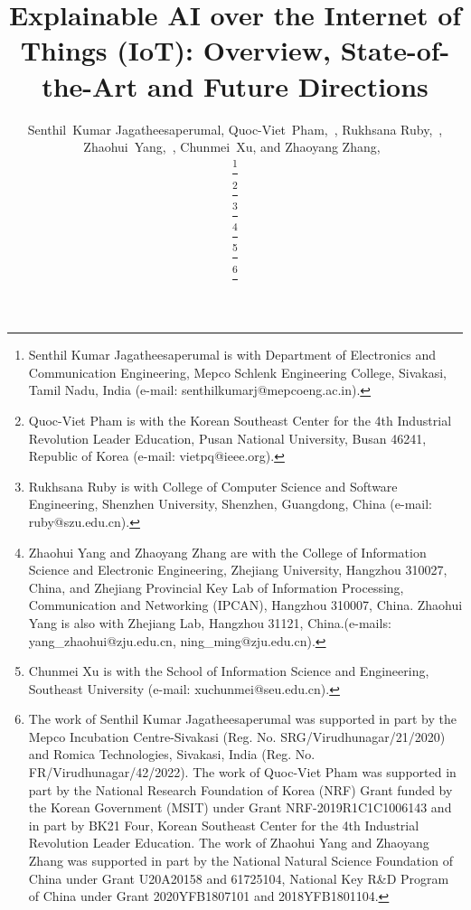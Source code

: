 \documentclass[journal]{IEEEtran}
\begin{document}
\title{Explainable AI over the Internet of Things (IoT): Overview, State-of-the-Art and Future Directions}
\author{Senthil~Kumar Jagatheesaperumal,
        Quoc-Viet~Pham,~,
        Rukhsana Ruby,~,
        Zhaohui~Yang,~, 
        Chunmei~Xu, and
        Zhaoyang Zhang,~

        
\thanks{Senthil Kumar Jagatheesaperumal is with Department of Electronics and Communication Engineering, Mepco Schlenk Engineering College, Sivakasi, Tamil Nadu, India (e-mail: senthilkumarj@mepcoeng.ac.in).}

\thanks{Quoc-Viet Pham is with the Korean Southeast Center for the 4th Industrial Revolution Leader Education, Pusan National University, Busan 46241, Republic of Korea (e-mail: vietpq@ieee.org). }

\thanks{Rukhsana Ruby is with College of Computer Science and Software Engineering, Shenzhen University, Shenzhen, Guangdong, China
(e-mail: ruby@szu.edu.cn).}

\thanks{Zhaohui Yang and Zhaoyang Zhang are with the College of Information Science and Electronic Engineering, Zhejiang University, Hangzhou 310027, China, and Zhejiang Provincial Key Lab of Information Processing, Communication and Networking (IPCAN), Hangzhou 310007, China. Zhaohui Yang is also with Zhejiang Lab, Hangzhou 31121, China.(e-mails: yang\_zhaohui@zju.edu.cn, ning\_ming@zju.edu.cn).}

\thanks{Chunmei Xu is with the School of Information Science and Engineering, Southeast University (e-mail: xuchunmei@seu.edu.cn).}

\thanks{The work of Senthil Kumar Jagatheesaperumal was supported in part by the Mepco Incubation Centre-Sivakasi (Reg. No. SRG/Virudhunagar/21/2020) and Romica Technologies, Sivakasi, India  (Reg. No.
FR/Virudhunagar/42/2022). The work of Quoc-Viet Pham was supported in part by the National Research Foundation of Korea (NRF) Grant funded by the Korean Government (MSIT) under Grant NRF-2019R1C1C1006143 and in part by BK21 Four, Korean Southeast Center for the 4th Industrial Revolution Leader Education. The work of Zhaohui Yang and Zhaoyang Zhang was supported in part by the National Natural Science Foundation of China under Grant U20A20158 and 61725104, National Key R\&D Program of China under Grant 2020YFB1807101 and 2018YFB1801104.}
}
 
\end{document}
